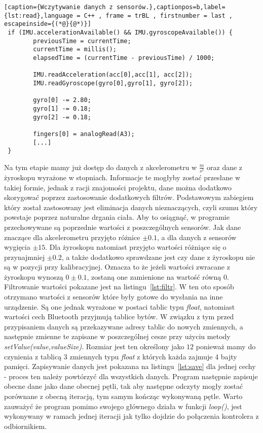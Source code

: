 \begin{lstlisting}[caption={Wczytywanie danych z sensorów.},captionpos=b,label={lst:read},language = C++ , frame = trBL , firstnumber = last , escapeinside={(*@}{@*)}]
 if (IMU.accelerationAvailable() && IMU.gyroscopeAvailable()) {
        previousTime = currentTime;
        currentTime = millis();
        elapsedTime = (currentTime - previousTime) / 1000;   

        IMU.readAcceleration(acc[0],acc[1], acc[2]);  
        IMU.readGyroscope(gyro[0],gyro[1], gyro[2]);
        
        gyro[0] -= 2.80;
        gyro[1] -= 0.18;
        gyro[2] -= 0.18;

        fingers[0] = analogRead(A3);
        [...]
 }
\end{lstlisting}
Na tym etapie mamy już dostęp do danych z akcelerometru w {\Large $\frac{m}{s^2}$} oraz dane z żyroskopu wyrażone w stopniach. Informacje te mogłyby zostać przesłane w takiej formie, jednak z racji znajomości projektu, dane można dodatkowo skorygować poprzez zastosowanie dodatkowych filtrów. Podstawowym zabiegiem który został zastosowany jest eliminacja danych nieznaczących, czyli szumu który powstaje poprzez naturalne drgania ciała. Aby to osiągnąć, w programie przechowywane są poprzednie wartości z poszczególnych sensorów. Jak dane znaczące dla akcelerometru przyjęto różnice $\pm 0.1$, a dla danych z sensorów wygięcia $\pm 15$. Dla żyroskopu natomiast przyjęto wartości różniące się o przynajmniej $\pm 0.2$, a także dodatkowo sprawdzane jest czy dane z żyroskopu nie są w pozycji przy kalibracyjnej. Oznacza to że jeżeli wartości zwracane z żyroskopu wynoszą $0\pm 0.1$, zostaną one zamienione na wartość równą $0$. Filtrowanie wartości pokazane jest na listingu~\ref{lst:filtr}. W ten oto sposób otrzymano wartości z sensorów które były gotowe do wysłania na inne urządzenie. Są one jednak wyrażone w postaci tablic typu \textit{float}, natomiast wartości cech Bluetooth przyjmują tablice bytów. W związku z tym przed przypisaniem danych są przekazywane adresy tablic do nowych zmiennych, a następnie zmienne te zapisane w poszczególnej cesze przy użyciu metody \textit{setValue(value,valueSize)}. Rozmiar jest ten określony jako $12$ ponieważ mamy do czynienia z tablicą 3 zmiennych typu \textit{float} z których każda zajmuje 4 bajty pamięci. Zapisywanie danych jest pokazana na listingu~\ref{lst:save} dla jednej cechy - proces ten należy powtórzyć dla wszystkich danych. Program następnie zapisuje obecne dane jako dane obecnej pętli, tak aby następne odczyty mogły zostać porównane z obecną iteracją, tym samym kończąc wykonywaną pętle. Warto zauważyć że program pomimo swojego głównego działa w funkcji \textit{loop()}, jest wykonywany w ramach jednej iteracji jak tylko dojdzie do połączenia kontrolera z odbiornikiem.
